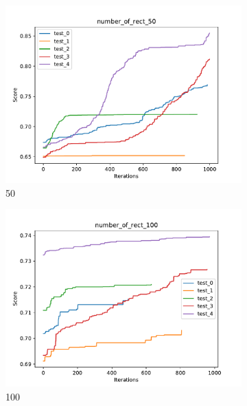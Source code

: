 \begin{figure}[H]
\begin{subfigure}[b]{0.49\linewidth}
        \includegraphics[width=\linewidth]{img/number_of_rect_50.pdf}
        \caption{50}
    \end{subfigure}
    \begin{subfigure}[b]{0.49\linewidth}
        \includegraphics[width=\linewidth]{img/number_of_rect_100.pdf}
        \caption{100}
    \end{subfigure}
    \begin{subfigure}[b]{0.49\linewidth}

\end{subfigure}
\end{figure}
